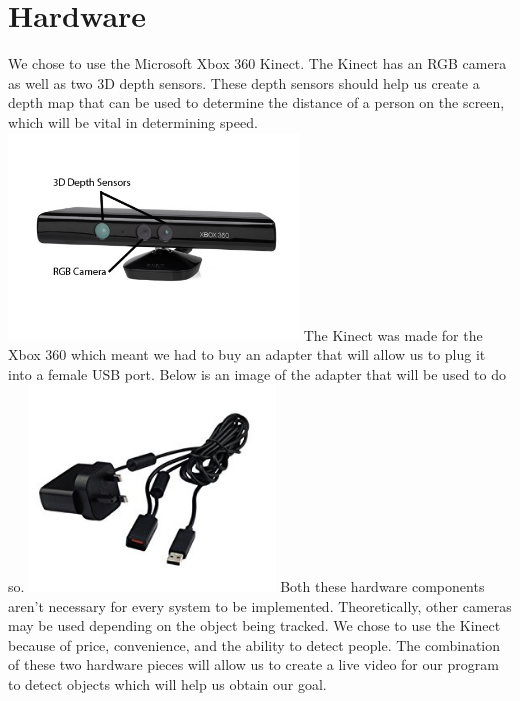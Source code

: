 \documentclass[onecolumn, draftclsnofoot,10pt, compsoc]{IEEEtran}
\begin{document}
\section{Hardware}
We chose to use the Microsoft Xbox 360 Kinect. The Kinect has an RGB camera as well as two 3D depth sensors. These depth sensors should help us create a depth map that can be used to determine the distance of a person on the screen, which will be vital in determining speed.
\newline
\includegraphics[height=5.5cm]{kinect1}
\newline
The Kinect was made for the Xbox 360 which meant we had to buy an adapter that will allow us to plug it into a female USB port. Below is an image of the adapter that will be used to do so.
\newline
\includegraphics[height=5.5cm]{adapter}
\newline
Both these hardware components aren't necessary for every system to be implemented.
Theoretically, other cameras may be used depending on the object being tracked.
We chose to use the Kinect because of price, convenience, and the ability to detect people.
The combination of these two hardware pieces will allow us to create a live video for our program to detect objects which will help us obtain our goal.
\end{document}
